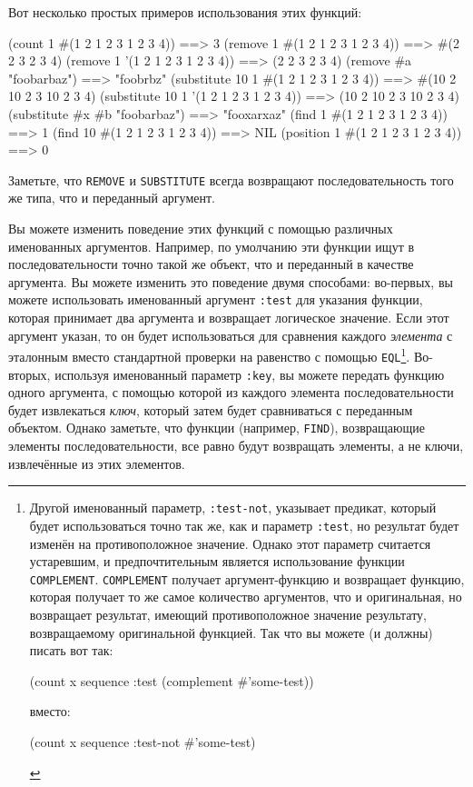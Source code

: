 Вот несколько простых примеров использования этих функций:

\begin{myverb}
(count 1 #(1 2 1 2 3 1 2 3 4))         ==> 3
(remove 1 #(1 2 1 2 3 1 2 3 4))        ==> #(2 2 3 2 3 4)
(remove 1 '(1 2 1 2 3 1 2 3 4))        ==> (2 2 3 2 3 4)
(remove #\bslash{}a "foobarbaz")               ==> "foobrbz"
(substitute 10 1 #(1 2 1 2 3 1 2 3 4)) ==> #(10 2 10 2 3 10 2 3 4)
(substitute 10 1 '(1 2 1 2 3 1 2 3 4)) ==> (10 2 10 2 3 10 2 3 4)
(substitute #\bslash{}x #\bslash{}b "foobarbaz")       ==> "fooxarxaz"
(find 1 #(1 2 1 2 3 1 2 3 4))          ==> 1
(find 10 #(1 2 1 2 3 1 2 3 4))         ==> NIL
(position 1 #(1 2 1 2 3 1 2 3 4))      ==> 0
\end{myverb}

Заметьте, что \lstinline{REMOVE} и \lstinline{SUBSTITUTE} всегда возвращают последовательность
того же типа, что и переданный аргумент.

Вы можете изменить поведение этих функций с помощью различных именованных аргументов.
Например, по умолчанию эти функции ищут в последовательности точно такой же объект, что и
переданный в качестве аргумента.  Вы можете изменить это поведение двумя способами: во-первых,
вы можете использовать именованный аргумент \lstinline{:test} для указания функции,
которая принимает два аргумента и возвращает логическое значение.  Если этот аргумент
указан, то он будет использоваться для сравнения каждого \textit{элемента} с эталонным вместо стандартной
проверки на равенство с помощью \lstinline{EQL}\footnote{Другой именованный параметр,
  \lstinline{:test-not}, указывает предикат, который будет использоваться точно так же, как и
  параметр \lstinline{:test}, но результат будет изменён на
  противоположное значение.  Однако этот параметр считается устаревшим, и предпочтительным
  является использование функции \lstinline{COMPLEMENT}.  \lstinline{COMPLEMENT} получает
  аргумент-функцию и возвращает функцию, которая получает то же самое количество
  аргументов, что и оригинальная, но возвращает результат, имеющий противоположное
  значение результату, возвращаемому оригинальной функцией.  Так что вы можете (и должны)
  писать вот так:

\begin{myverb}
(count x sequence :test (complement #'some-test))
\end{myverb}

\noindent{}вместо:

\begin{myverb}
(count x sequence :test-not #'some-test)
\end{myverb}

}. Во-вторых, используя именованный параметр \lstinline{:key}, вы можете передать функцию одного
аргумента, с помощью которой из каждого элемента последовательности будет извлекаться \textit{ключ},
который затем будет сравниваться с переданным объектом.  Однако заметьте, что
функции (например, \lstinline{FIND}), возвращающие элементы последовательности, все равно будут
возвращать элементы, а не ключи, извлечённые из этих элементов.

